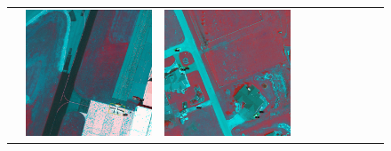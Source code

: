 \begin{figure}[H]
\begin{tabularx}{\textwidth}{c|*{9}{X}}
    &  \includegraphics[trim={650pt 120pt 170pt 720pt},clip,width=\linewidth]{images/015Results/02perm_exp/comp_images/gbndvi/487.png}
    & \includegraphics[trim={230pt 200pt 680pt 725pt},clip,width=\linewidth]{images/015Results/02perm_exp/comp_images/gbndvi/509.png}

\end{tabularx}
\end{figure}
